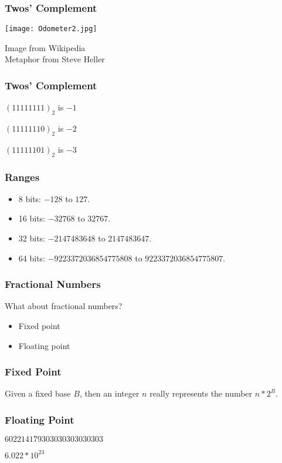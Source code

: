 \begin{frame}[fragile]
\frametitle{Twos' Complement}

\centering
\texttt{[image: Odometer2.jpg]}

\begin{flushright}
Image from Wikipedia\\
Metaphor from Steve Heller
\end{flushright}
\end{frame}

\begin{frame}[fragile]
\frametitle{Twos' Complement}

$(11111111)_2$ is $-1$

$(11111110)_2$ is $-2$

$(11111101)_2$ is $-3$

\end{frame}

\begin{frame}[fragile]
\frametitle{Ranges}

\begin{itemize}
\item 8 bits: $-128$ to $127$.
\item 16 bits: $-32768$ to $32767$.
\item 32 bits: $-2147483648$ to $2147483647$.
\item 64 bits: $-9223372036854775808$ to $9223372036854775807$.
\end{itemize}
\end{frame}

\begin{frame}[fragile]
\frametitle{Fractional Numbers}

What about fractional numbers?

\begin{itemize}
\item Fixed point
\item Floating point
\end{itemize}

\end{frame}

\begin{frame}[fragile]
\frametitle{Fixed Point}

Given a fixed base $B$, then an integer $n$ really represents the number $n * 2^B$.


\end{frame}

\begin{frame}[fragile]
\frametitle{Floating Point}

$602214179303030303030303$

\pause
$6.022 * 10^{23}$
\end{frame}

